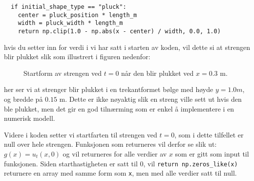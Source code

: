 \begin{lstlisting}
  if initial_shape_type == "pluck":
    center = pluck_position * length_m
    width = pluck_width * length_m
    return np.clip(1.0 - np.abs(x - center) / width, 0.0, 1.0)
\end{lstlisting}

hvis du setter inn for verdi i vi har satt i starten av koden, vil dette si at strengen blir plukket slik som 
illustrert i figuren nedenfor:

\begin{figure}[H]
    \centering
    \caption{Startform av strengen ved $t=0$ når den blir plukket ved $x=0.3$ m.}
\end{figure}

her ser vi at strenger blir plukket i en trekantformet bølge med høyde $y=1.0m$, og bredde på $0.15$ m. Dette er
ikke nøyaktig slik en streng ville sett ut hvis den ble plukket, men det gir en god tilnærming som er enkel å 
implementere i en numerisk modell.

Videre i koden setter vi startfarten til strengen ved $t=0$, som i dette tilfellet er null over hele strengen. Funksjonen som returneres vil 
derfor se slik ut: $g(x)=u_t(x,0)$ og vil returneres for alle verdier av $x$ som er gitt som input til funksjonen. Siden starthastigheten er satt
til $0$, vil \verb|return np.zeros_like(x)| returnere en array med samme form som \verb|x|, men med alle verdier satt til null.

